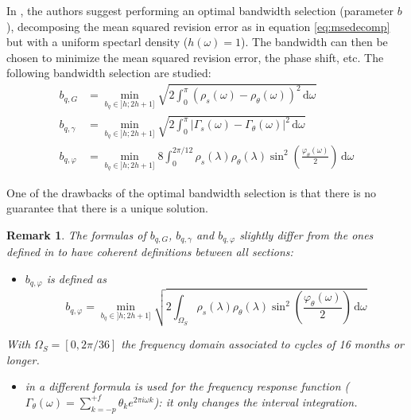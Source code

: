 \documentclass[
  12pt,
  ,
  a4paper]{article}
\providecommand{\tightlist}{%
  \setlength{\itemsep}{0pt}\setlength{\parskip}{0pt}}
\newcommand\1{\mathds{1}}
\newcommand\ud{\,\mathrm{d}}
\newtheorem*{remark}{Remark}
\begin{document}
In \textcite{dagumbianconcini2015}, the authors suggest performing an optimal bandwidth selection (parameter \(b\)), decomposing the mean squared revision error as in equation \eqref{eq:msedecomp} but with a uniform spectarl density (\(h(\omega)=1\)).
The bandwidth can then be chosen to minimize the mean squared revision error, the phase shift, etc.
The following bandwidth selection are studied:
\begin{align*}
b_{q,G}&=\underset{b_q\in]h;2 h+1]}{\min}
\sqrt{2\int_{0}^{\pi}
\left(\rho_s(\omega)-\rho_\theta(\omega)\right)^{2}\ud \omega
}\\
b_{q,\gamma}&=\underset{b_q\in]h;2 h+1]}{\min}
\sqrt{2\int_{0}^{\pi}
\lvert \Gamma_s(\omega)-\Gamma_\theta(\omega)\rvert^2\ud \omega
} \\
b_{q,\varphi}&=\underset{b_q\in]h;2 h+1]}{\min}
8\int_{0}^{2\pi/12}
\rho_s(\lambda)\rho_\theta(\lambda)\sin^{2}\left(\frac{\varphi_\theta(\omega)}{2}\right)\ud \omega
\end{align*}

One of the drawbacks of the optimal bandwidth selection is that there is no guarantee that there is a unique solution.

\begin{remark}

The formulas of \(b_{q,G}\), \(b_{q,\gamma}\) and \(b_{q,\varphi}\) slightly differ from the ones defined in \textcite{dagumbianconcini2015} to have coherent definitions between all sections:

\begin{itemize}
\tightlist
\item
  \(b_{q,\varphi}\) is defined as
  \[
  b_{q,\varphi}=\underset{b_q\in]h;2 h+1]}{\min}
  \sqrt{2\int_{\Omega_S}
  \rho_s(\lambda)\rho_\theta(\lambda)\sin^{2}\left(\frac{\varphi_\theta(\omega)}{2}\right)\ud \omega}
  \]
\end{itemize}

With \(\Omega_S=[0,2\pi/36]\) the frequency domain associated to cycles of 16 months or longer.

\begin{itemize}
\tightlist
\item
  in \textcite{dagumbianconcini2015} a different formula is used for the frequency response function (\(\Gamma_\theta(\omega)=\sum_{k=-p}^{+f} \theta_k e^{2\pi i \omega k}\)): it only changes the interval integration.
\end{itemize}

\end{remark}
\end{document}
